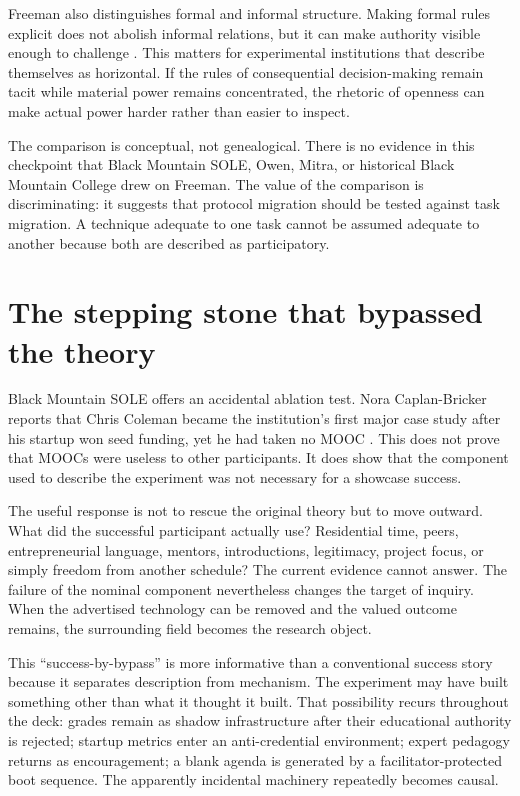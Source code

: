 \documentclass[11pt]{article}
\begin{document}
Freeman also distinguishes formal and informal structure. Making formal rules explicit does not abolish informal relations, but it can make authority visible enough to challenge \cite{freeman1972tyranny}. This matters for experimental institutions that describe themselves as horizontal. If the rules of consequential decision-making remain tacit while material power remains concentrated, the rhetoric of openness can make actual power harder rather than easier to inspect.

The comparison is conceptual, not genealogical. There is no evidence in this checkpoint that Black Mountain SOLE, Owen, Mitra, or historical Black Mountain College drew on Freeman. The value of the comparison is discriminating: it suggests that protocol migration should be tested against task migration. A technique adequate to one task cannot be assumed adequate to another because both are described as participatory.

\section{The stepping stone that bypassed the theory}
Black Mountain SOLE offers an accidental ablation test. Nora Caplan-Bricker reports that Chris Coleman became the institution's first major case study after his startup won seed funding, yet he had taken no MOOC \cite{caplanbricker2013blackmountain}. This does not prove that MOOCs were useless to other participants. It does show that the component used to describe the experiment was not necessary for a showcase success.

The useful response is not to rescue the original theory but to move outward. What did the successful participant actually use? Residential time, peers, entrepreneurial language, mentors, introductions, legitimacy, project focus, or simply freedom from another schedule? The current evidence cannot answer. The failure of the nominal component nevertheless changes the target of inquiry. When the advertised technology can be removed and the valued outcome remains, the surrounding field becomes the research object.

This ``success-by-bypass'' is more informative than a conventional success story because it separates description from mechanism. The experiment may have built something other than what it thought it built. That possibility recurs throughout the deck: grades remain as shadow infrastructure after their educational authority is rejected; startup metrics enter an anti-credential environment; expert pedagogy returns as encouragement; a blank agenda is generated by a facilitator-protected boot sequence. The apparently incidental machinery repeatedly becomes causal.
\end{document}
